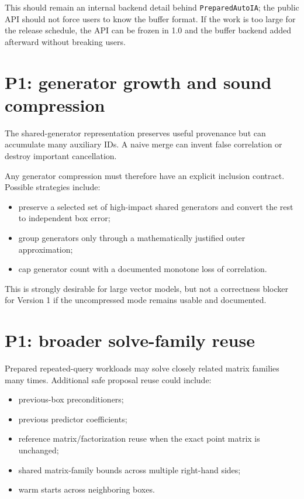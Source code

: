 \documentclass[11pt]{article}
\begin{document}
This should remain an internal backend detail behind \texttt{PreparedAutoIA}; the
public API should not force users to know the buffer format.  If the work is too
large for the release schedule, the API can be frozen in 1.0 and the buffer
backend added afterward without breaking users.

\section{P1: generator growth and sound compression}

The shared-generator representation preserves useful provenance but can accumulate
many auxiliary IDs.  A naive merge can invent false correlation or destroy
important cancellation.

Any generator compression must therefore have an explicit inclusion contract.
Possible strategies include:
\begin{itemize}[leftmargin=*]
\item preserve a selected set of high-impact shared generators and convert the
rest to independent box error;
\item group generators only through a mathematically justified outer
approximation;
\item cap generator count with a documented monotone loss of correlation.
\end{itemize}

This is strongly desirable for large vector models, but not a correctness blocker
for Version 1 if the uncompressed mode remains usable and documented.

\section{P1: broader solve-family reuse}

Prepared repeated-query workloads may solve closely related matrix families many
times.  Additional safe proposal reuse could include:
\begin{itemize}[leftmargin=*]
\item previous-box preconditioners;
\item previous predictor coefficients;
\item reference matrix/factorization reuse when the exact point matrix is
unchanged;
\item shared matrix-family bounds across multiple right-hand sides;
\item warm starts across neighboring boxes.
\end{itemize}
\end{document}
